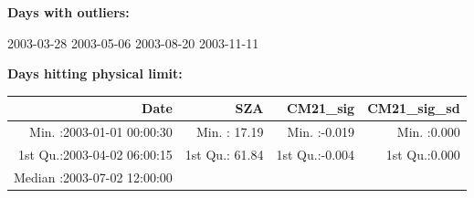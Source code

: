 \documentclass[
  10pt,
  a4paper,oneside]{article}
\begin{document}
\normalsize

\textbf{Days with outliers:}

2003-03-28 2003-05-06 2003-08-20 2003-11-11

\textbf{Days hitting physical limit:}

\footnotesize

\begin{longtable}[]{@{}rrrr@{}}
\toprule
\begin{minipage}[b]{0.33\columnwidth}\raggedleft
Date\strut
\end{minipage} & \begin{minipage}[b]{0.19\columnwidth}\raggedleft
SZA\strut
\end{minipage} & \begin{minipage}[b]{0.19\columnwidth}\raggedleft
CM21\_sig\strut
\end{minipage} & \begin{minipage}[b]{0.19\columnwidth}\raggedleft
CM21\_sig\_sd\strut
\end{minipage}\tabularnewline
\midrule
\endhead
\begin{minipage}[t]{0.33\columnwidth}\raggedleft
Min. :2003-01-01 00:00:30\strut
\end{minipage} & \begin{minipage}[t]{0.19\columnwidth}\raggedleft
Min. : 17.19\strut
\end{minipage} & \begin{minipage}[t]{0.19\columnwidth}\raggedleft
Min. :-0.019\strut
\end{minipage} & \begin{minipage}[t]{0.19\columnwidth}\raggedleft
Min. :0.000\strut
\end{minipage}\tabularnewline
\begin{minipage}[t]{0.33\columnwidth}\raggedleft
1st Qu.:2003-04-02 06:00:15\strut
\end{minipage} & \begin{minipage}[t]{0.19\columnwidth}\raggedleft
1st Qu.: 61.84\strut
\end{minipage} & \begin{minipage}[t]{0.19\columnwidth}\raggedleft
1st Qu.:-0.004\strut
\end{minipage} & \begin{minipage}[t]{0.19\columnwidth}\raggedleft
1st Qu.:0.000\strut
\end{minipage}\tabularnewline
\begin{minipage}[t]{0.33\columnwidth}\raggedleft
Median :2003-07-02 12:00:00\strut
\end{minipage} & \begin{minipage}[t]{0.19\columnwidth}\raggedleft

\end{minipage}
\end{longtable}
\end{document}
